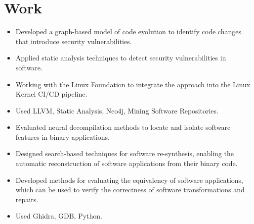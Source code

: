 \section{Work}
%
{
    \begin{itemize}
        \item Developed a graph-based model of code evolution to identify code
              changes that introduce security vulnerabilities.
        \item Applied static analysis techniques to detect security
              vulnerabilities in software.
        \item Working with the Linux Foundation to integrate the approach into
              the Linux Kernel CI/CD pipeline.
        \item Used LLVM, Static Analysis, Neo4j, Mining Software Repositories.
    \end{itemize}
}

{
    \begin{itemize}
        \item Evaluated neural decompilation methods to locate and isolate
              software features in binary applications.
        \item Designed search-based techniques for software re-synthesis,
              enabling the automatic reconstruction of software applications
              from their binary code.
        \item Developed methods for evaluating the equivalency of software
              applications, which can be used to verify the correctness of
              software transformations and repairs.
        \item Used Ghidra, GDB, Python.
    \end{itemize}
}


